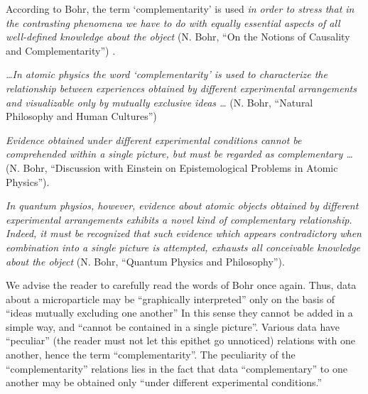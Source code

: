 \documentclass[a4paper,sfsidenotes,colorlinks=true]{tufte-book}
\numberwithin{equation}{section}
\numberwithin{figure}{section}
\begin{document}
According to Bohr, the term `complementarity' is used \emph{in order to
stress that in the contrasting phenomena we have to do with equally
essential aspects of all well-defined knowledge about the object}
(N. Bohr, ``On the Notions of Causality and Complementarity'') .

\emph{\ldots In atomic physics the word
`complementarity' is used to characterize the relationship between
experiences obtained by different experimental arrangements and
visualizable only by mutually exclusive ideas \ldots} (N. Bohr, ``Natural
Philosophy and Human Cultures'') 


\emph{Evidence obtained under different experimental conditions cannot be
comprehended within a single picture, but must be regarded as
complementary \ldots}(N. Bohr, ``Discussion with Einstein on
Epistemological Problems in Atomic Physics'').

\emph{In quantum physios, however, evidence about atomic objects
obtained by different experimental arrangements exhibits a novel kind
of complementary relationship. Indeed, it must be recognized that such
evidence which appears contradictory when eombination into a single
picture is attempted, exhausts all conceivable knowledge about the
object} (N. Bohr, ``Quantum Physics and Philosophy'').  


We advise the reader to carefully read the words of Bohr once
again. Thus, data about a microparticle may be ``graphically
interpreted'' only on the basis of ``ideas mutually excluding one
another'' In this sense they cannot be added in a simple way, and
``cannot be contained in a single picture''. Various data have
``peculiar'' (the reader must not let this epithet go unnoticed)
relations with one another, hence the term ``complementarity''. The
peculiarity of the ``complementarity'' relations lies in the fact
that data ``complementary'' to one another may be obtained only
``under different experimental conditions.''
\end{document}

